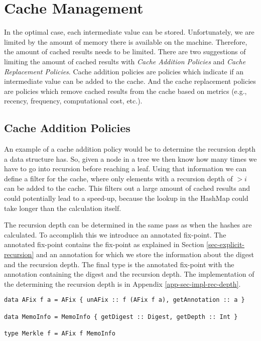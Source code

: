 \section{Cache Management}
\label{sec-cache-manage}

In the optimal case, each intermediate value can be stored. Unfortunately, we are limited by the amount of memory there is available on the machine. Therefore, the amount of cached results needs to be limited. There are two suggestions of limiting the amount of cached results with \textit{Cache Addition Policies} and \textit{Cache Replacement Policies}. Cache addition policies are policies which indicate if an intermediate value can be added to the cache. And the cache replacement policies are policies which remove cached results from the cache based on metrics (e.g., recency, frequency, computational cost, etc.). 

\subsection{Cache Addition Policies}

An example of a cache addition policy would be to determine the recursion depth a data structure has. So, given a node in a tree we then know how many times we have to go into recursion before reaching a leaf. Using that information we can define a filter for the cache, where only elements with a recursion depth of $>i$ can be added to the cache. This filters out a large amount of cached results and could potentially lead to a speed-up, because the lookup in the HashMap could take longer than the calculation itself. 

\pagebreak
The recursion depth can be determined in the same pass as when the hashes are calculated. To accomplish this we introduce an annotated fix-point. The annotated fix-point contains the fix-point as explained in Section \ref*{sec-explicit-recursion} and an annotation for which we store the information about the digest and the recursion depth. The final  type is the annotated fix-point with the annotation containing the digest and the recursion depth. The implementation of the determining the recursion depth is in Appendix \ref*{app-sec-impl-rec-depth}.

\begin{verbatim}
data AFix f a = AFix { unAFix :: f (AFix f a), getAnnotation :: a }

data MemoInfo = MemoInfo { getDigest :: Digest, getDepth :: Int }

type Merkle f = AFix f MemoInfo
\end{verbatim}

